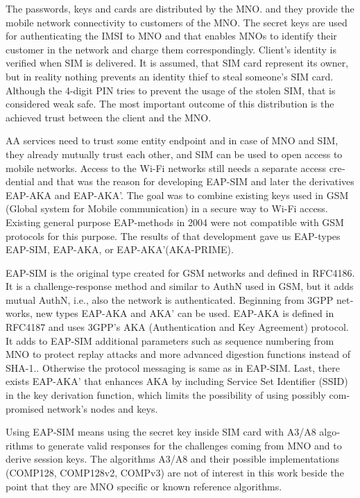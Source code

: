 \documentclass[12pt,a4paper,english]{tutthesis}
\begin{document}
\begin{otherlanguage}{english}
The passwords, keys and cards are distributed by the MNO.
 and they 
provide the mobile network connectivity to customers of the MNO.  The
secret keys are used for authenticating the IMSI to MNO and that
enables MNOs to identify their customer in the network and charge them
correspondingly.  Client's identity is verified when SIM is delivered.
It is assumed, that SIM card represent its owner, but in reality
nothing prevents an identity thief to steal someone's SIM
card. Although the 4-digit PIN tries to prevent the usage of the
stolen SIM, that is considered weak safe\cite[p.31]{aaa-nakhjiri2005}.
The most important outcome of this distribution is the achieved trust
between the client and the MNO.


AA services need to trust some entity endpoint and in case of MNO and
SIM, they already mutually trust each other, and SIM can be used 
to open access to mobile networks.
Access to the Wi-Fi networks still needs a separate access credential
and that was the reason for developing EAP-SIM and later the
derivatives EAP-AKA and EAP-AKA'.  The goal was to combine 
existing keys used in  GSM (Global system for Mobile communication)
in a secure way to Wi-Fi access. Existing general purpose EAP-methods in 2004 were not
compatible with GSM protocols for this purpose.\cite[p.93]{hav-doc}
The results of that development gave us EAP-types EAP-SIM, EAP-AKA, or
EAP-AKA'(AKA-PRIME).

EAP-SIM is the original type created for GSM networks and defined 
in RFC4186\cite{rfc4186}.
It is a challenge-response method and similar to AuthN used in GSM, 
but it adds mutual AuthN, i.e., also the network is authenticated.
Beginning from 3GPP networks, new types EAP-AKA and AKA' can be used.
EAP-AKA is defined in RFC4187\cite{rfc4187} and 
uses 3GPP's AKA (Authentication and Key Agreement) protocol.
It adds to EAP-SIM additional parameters such as
sequence numbering from MNO to protect replay attacks and more
advanced digestion functions instead of SHA-1.\cite{rfc5448}.
Otherwise the protocol messaging is same as in  EAP-SIM.
Last, there exists EAP-AKA' that enhances AKA by including Service Set
Identifier (SSID) 
in the key derivation function, which limits the possibility of using possibly
compromised network's nodes and keys. 


  Using EAP-SIM means using the secret key inside SIM card with A3/A8
algorithms to generate valid responses for the challenges coming from 
MNO and to derive session keys.  The algorithms A3/A8 and their
possible implementations (COMP128, COMP128v2, COMPv3) are not of
interest in this work beside the point that they are MNO specific or known reference algorithms.



\end{otherlanguage}
\end{document}
